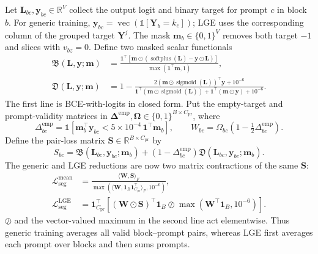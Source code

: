 \documentclass[10pt]{article}
\newcommand{\R}{\mathbb{R}}
\newcommand{\cL}{\mathcal{L}}
\newcommand{\ones}{\bm{1}}
\newcommand{\softplus}{\operatorname{softplus}}
\newcommand{\sigm}{\operatorname{sigmoid}}
\newcommand{\ind}{\mathbb{1}}
\begin{document}
Let $\bm L_{bc},\bm y_{bc}\in\R^V$ collect the output logit and binary target
for prompt $c$ in block $b$.  For generic training,
$\bm y_{bc}=\operatorname{vec}(\ind[\bm Y_b=k_c])$; LGE uses the corresponding
column of the grouped target $\bm Y^j$.  The mask
$\bm m_b\in\{0,1\}^V$ removes both target $-1$ and slices with $v_{bz}=0$.
Define two masked scalar functionals
\begin{equation}
\begin{aligned}
 \mathfrak B(\bm L,\bm y;\bm m)
 &=\frac{\ones^\top\!\left[\bm m\odot
        (\softplus(\bm L)-\bm y\odot\bm L)\right]}
        {\max(\ones^\top\bm m,1)},\\
 \mathfrak D(\bm L,\bm y;\bm m)
 &=1-\frac{2(\bm m\odot\sigm(\bm L))^\top\bm y+10^{-6}}
 {\ones^\top(\bm m\odot\sigm(\bm L))
  +\ones^\top(\bm m\odot\bm y)+10^{-6}}.
\end{aligned}
\label{eq:vector-bce-dice}
\end{equation}
The first line is BCE-with-logits in closed form.  Put the empty-target and
prompt-validity matrices in
$\bm\Delta^{\mathrm{emp}},\bm\Omega
\in\{0,1\}^{B\times C_{\mathrm{pr}}}$,
where
\begin{equation}
 \Delta^{\mathrm{emp}}_{bc}=\ind\!\left[
 \bm m_b^\top\bm y_{bc}<5\times10^{-4}\,\ones^\top\bm m_b\right],
 \qquad
 W_{bc}=\Omega_{bc}\left(1-\tfrac12\Delta^{\mathrm{emp}}_{bc}\right).
\end{equation}
Define the pair-loss matrix $\bm S\in\R^{B\times C_{\mathrm{pr}}}$ by
\begin{equation}
    S_{bc}=\mathfrak B(\bm L_{bc},\bm y_{bc};\bm m_b)
       +(1-\Delta^{\mathrm{emp}}_{bc})
        \mathfrak D(\bm L_{bc},\bm y_{bc};\bm m_b).
    \label{eq:pair-loss-matrix}
\end{equation}
The generic and LGE reductions are now two matrix contractions of the same
$\bm S$:
\begin{equation}
\boxed{
\begin{aligned}
 \cL_{\mathrm{seg}}^{\mathrm{mean}}
 &=\frac{\langle\bm W,\bm S\rangle_F}
        {\max(\langle\bm W,
          \ones_B\ones_{C_{\mathrm{pr}}}^\top\rangle_F,10^{-6})},\\
 \cL_{\mathrm{seg}}^{\mathrm{LGE}}
 &=\ones_{C_{\mathrm{pr}}}^\top
   \left[(\bm W\odot\bm S)^\top\ones_B
   \oslash\max(\bm W^\top\ones_B,10^{-6})\right].
\end{aligned}}
\label{eq:matrix-seg-reductions}
\end{equation}
$\oslash$ and the vector-valued maximum in the second line act elementwise.
Thus generic training averages all valid block--prompt pairs, whereas LGE first
averages each prompt over blocks and then sums prompts.
\end{document}
